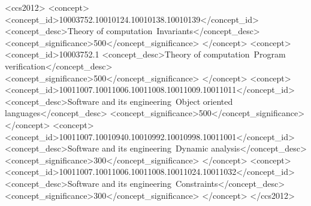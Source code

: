 \documentclass[acmsmall,review]{acmart}\settopmatter{printfolios=true}
\begin{document}
\begin{CCSXML}
	<ccs2012>
	<concept>
	<concept_id>10003752.10010124.10010138.10010139</concept_id>
	<concept_desc>Theory of computation~Invariants</concept_desc>
	<concept_significance>500</concept_significance>
	</concept>
	<concept>
	<concept_id>10003752.1
	<concept_desc>Theory of computation~Program verification</concept_desc>
	<concept_significance>500</concept_significance>
	</concept>
	<concept>
	<concept_id>10011007.10011006.10011008.10011009.10011011</concept_id>
	<concept_desc>Software and its engineering~Object oriented languages</concept_desc>
	<concept_significance>500</concept_significance>
	</concept>
	<concept>
	<concept_id>10011007.10010940.10010992.10010998.10011001</concept_id>
	<concept_desc>Software and its engineering~Dynamic analysis</concept_desc>
	<concept_significance>300</concept_significance>
	</concept>
	<concept>
	<concept_id>10011007.10011006.10011008.10011024.10011032</concept_id>
	<concept_desc>Software and its engineering~Constraints</concept_desc>
	<concept_significance>300</concept_significance>
	</concept>
	</ccs2012>
\end{CCSXML}





\maketitle




\end{document}
